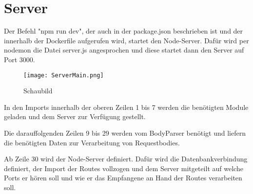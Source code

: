 
\chapter{Server}
\label{ch:Server}

Der Befehl "npm run dev", der auch in der package.json beschrieben ist und der innerhalb der Dockerfile aufgerufen wird, startet den Node-Server. Dafür wird per nodemon die Datei server.js angesprochen und diese startet dann den Server auf Port 3000.

\begin{figure}[h]
\texttt{[image: ServerMain.png]}
\vspace{3pt}
\caption{Schaubild\footnotemark}
\label{fig:blueant}
\end{figure}


In den Imports innerhalb der oberen Zeilen 1 bis 7 werden die benötigten Module geladen und dem Server zur Verfügung gestellt.

Die darauffolgenden Zeilen 9 bis 29 werden vom BodyParser benötigt und liefern die benötigten Daten zur Verarbeitung von Requestbodies.

Ab Zeile 30 wird der Node-Server definiert. Dafür wird die Datenbankverbindung definiert, der Import der Routes vollzogen und dem Server mitgeteilt auf welche Ports er hören soll und wie er das Empfangene an Hand der Routes verarbeiten soll.